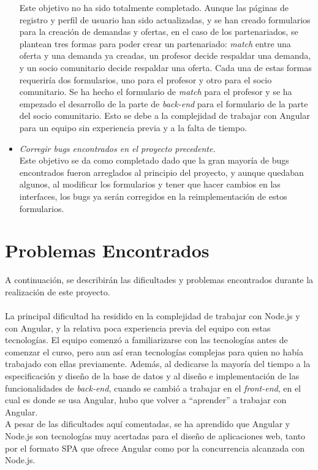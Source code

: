 \documentclass[11pt]{book}
\begin{document}
\begin{itemize}
		Este objetivo no ha sido totalmente completado. Aunque las páginas de registro y perfil de usuario han sido actualizadas, y se han creado formularios para la creación de demandas y ofertas, en el caso de los partenariados, se plantean tres formas para poder crear un partenariado: \emph{match} entre una oferta y una demanda ya creadas, un profesor decide respaldar una demanda, y un socio comunitario decide respaldar una oferta. Cada una de estas formas requeriría dos formularios, uno para el profesor y otro para el socio comunitario. Se ha hecho el formulario de \emph{match} para el profesor y se ha empezado el desarrollo de la parte de \emph{back-end} para el formulario de la parte del socio comunitario. Esto se debe a la complejidad de trabajar con Angular para un equipo sin experiencia previa y a la falta de tiempo.
		\item \emph{Corregir bugs encontrados en el proyecto precedente.}\\
		Este objetivo se da como completado dado que la gran mayoría de bugs encontrados fueron arreglados al principio del proyecto, y aunque quedaban algunos, al modificar los formularios y tener que hacer cambios en las interfaces, los bugs ya serán corregidos en la reimplementación de estos formularios.
		
	\end{itemize}
	
	\section{Problemas Encontrados}
	A continuación, se describirán las dificultades y problemas encontrados durante la realización de este proyecto. \\\\
	La principal dificultad ha residido en la complejidad de trabajar con Node.js y con Angular, y la relativa poca experiencia previa del equipo con estas tecnologías. El equipo comenzó a familiarizarse con las tecnologías antes de comenzar el curso, pero aun así eran tecnologías complejas para quien no había trabajado con ellas previamente. Además, al dedicarse la mayoría del tiempo a la especificación y diseño de la base de datos y al diseño e implementación de las funcionalidades de \emph{back-end}, cuando se cambió a trabajar en el \emph{front-end}, en el cual es donde se usa Angular, hubo que volver a ``aprender'' a trabajar con Angular.\\
	A pesar de las dificultades aquí comentadas, se ha aprendido que Angular y Node.js son tecnologías muy acertadas para el diseño de aplicaciones web, tanto por el formato SPA que ofrece Angular como por la concurrencia alcanzada con Node.js.
	
\end{document}
